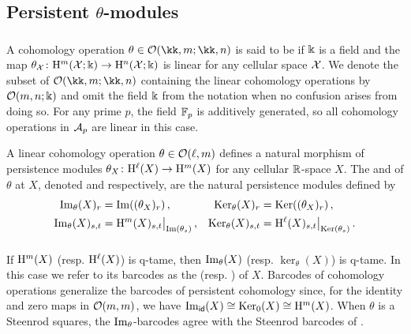 
\subsection{Persistent $\theta$-modules}

\subsubsection{}\label{ss:theta-modules}

A cohomology operation $\theta \in \cO(\kk,m; \kk,n)$ is said to be  if $\Bbbk$ is a field and the map $\theta_{\mathcal{X}} \colon \mathrm{H}^m(\mathcal{X}; \Bbbk) \to \mathrm{H}^n(\mathcal{X}; \Bbbk)$ is linear for any cellular space $\mathcal{X}$.
We denote the subset of $\cO(\kk,m; \kk,n)$ containing the linear cohomology operations by $\mathcal{O}(m,n;\Bbbk)$ and omit the field \(\Bbbk\) from the notation when no confusion arises from doing so.
For any prime $p$, the field ${\mathbb{F}_p}$ is additively generated, so all cohomology operations in $\mathcal{A}_p$ are linear in this case.

A linear cohomology operation \(\theta \in \mathcal{O}(\ell,m)\) defines a natural morphism of persistence modules $\theta_X \colon \mathrm{H}^\ell(X) \to \mathrm{H}^m(X)$ for any cellular $\mathbb{R}$-space $X$.
The  and  of $\theta$ at \(X\), denoted  and  respectively, are the natural persistence modules defined by
\begin{align*}
	\operatorname{Im}_\theta(X)_r &= \operatorname{Im}((\theta_X)_r)\,, &
	\operatorname{Ker}_\theta(X)_r &= \operatorname{Ker}((\theta_X)_r)\,, \\
	\operatorname{Im}_\theta(X)_{s,t} &= \mathrm{H}^m(X)_{s,t}\big|_{\operatorname{Im}(\theta_s)}\,, &
	\operatorname{Ker}_\theta(X)_{s,t} &= \mathrm{H}^\ell(X)_{s,t}\big|_{\operatorname{Ker}(\theta_s)}\,.
\end{align*}

\subsubsection{}\label{ss:theta-modules-q-tame}

If $\mathrm{H}^m(X)$ (resp. \(\mathrm{H}^\ell(X)\)) is q-tame, then $\operatorname{Im}_\theta(X)$ (resp. $\ker_\theta(X)$) is q-tame.
In this case we refer to its barcodes as the  (resp. ) of \(X\).
Barcodes of cohomology operations generalize the barcodes of persistent cohomology since, for the identity and zero maps in $\mathcal{O}(m,m)$, we have $\operatorname{Im}_{\mathsf{id}}(X) \cong \operatorname{Ker}_0(X) \cong \mathrm{H}^m(X)$.
When \(\theta\) is a Steenrod squares, the $\operatorname{Im}_\theta$-barcodes agree with the Steenrod barcodes of \cite{medina2022per_st}.
